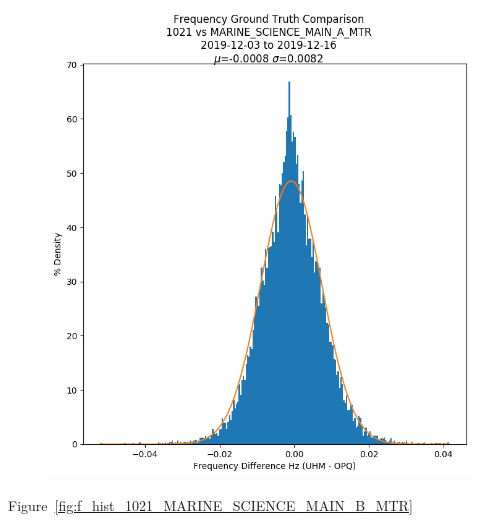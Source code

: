 \begin{figure}[H]
    \centering
    \includegraphics[width=\linewidth]{figures/f_hist_1021_MARINE_SCIENCE_MAIN_A_MTR.png}
    \caption{}
    \label{fig:f_hist_1021_MARINE_SCIENCE_MAIN_A_MTR}
\end{figure}

Figure~\ref{fig:f_hist_1021_MARINE_SCIENCE_MAIN_B_MTR}

